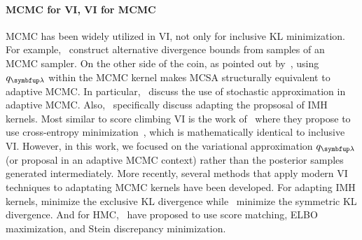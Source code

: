 \paragraph{MCMC for VI, VI for MCMC}
MCMC has been widely utilized in VI, not only for inclusive KL minimization.
For example,~\citet{pmlr-v37-salimans15, pmlr-v97-ruiz19a} construct alternative divergence bounds from samples of an MCMC sampler.
On the other side of the coin, as pointed out by~\citet{pmlr-v124-ou20a}, using \(q_{\vlambda}\) within the MCMC kernel makes MCSA structurally equivalent to adaptive MCMC.
In particular,~\citet{10.1007/s11222-008-9110-y, garthwaite_adaptive_2016} discuss the use of stochastic approximation in adaptive MCMC.
Also,~\citet{andrieu_ergodicity_2006, keith_adaptive_2008, holden_adaptive_2009, giordani_adaptive_2010} specifically discuss adapting the propsosal of IMH kernels.
Most similar to score climbing VI is the work of~\citet{keith_adaptive_2008} where they propose to use cross-entropy minimization~\citep{barbakh_cross_2009}, which is mathematically identical to inclusive VI.
However, in this work, we focused on the variational approximation \(q_{\vlambda}\) (or proposal in an adaptive MCMC context) rather than the posterior samples generated intermediately.
More recently, several methods that apply modern VI techniques to adaptating MCMC kernels have been developed.
For adapting IMH kernels, \citet{habib2018auxiliary} minimize the exclusive KL divergence while~\cite{neklyudov_metropolishastings_2019} minimize the symmetric KL divergence.
And for HMC,~\citet{zhang_variational_2018, pmlr-v139-campbell21a} have proposed to use score matching, ELBO maximization, and Stein discrepancy minimization.


